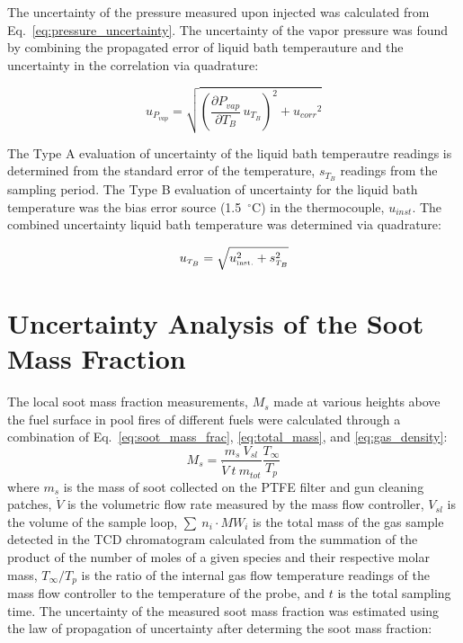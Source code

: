 \documentclass[12pt]{article}
\begin{document}
The uncertainty of the pressure measured upon injected was calculated from Eq.~\ref{eq:pressure_uncertainty}. The uncertainty of the vapor pressure was found by combining the propagated error of liquid bath temperauture and the uncertainty in the correlation via quadrature:

\begin{equation}
\label{eq:vapor_concentration_uncertainty}
u_{\scriptscriptstyle P_{vap}} = \sqrt{{\left(\frac{\partial P_{vap}}{\partial T_{B}}\,u_{\scriptscriptstyle T_{B}} \right)}^2+{u_{corr}}^2}
\end{equation} 

The Type A evaluation of uncertainty of the liquid bath temperautre readings is determined from the standard error of the temperature, $s_{T_{B}}$ readings from the sampling period. The Type B evaluation of uncertainty for the liquid bath temperature was the bias error source (1.5~$^\circ$C) in the thermocouple, $u_{inst}$. The combined uncertainty liquid bath temperature was determined via quadrature:

\begin{equation}
\label{eq:temp_bath_uncertainty}
u_{\scriptscriptstyle T_{B}} = \sqrt{u_{\rm \scriptscriptstyle inst.}^2 + s_{\scriptscriptstyle T_{B}}^2}
\end{equation}


\pagebreak

\section{Uncertainty Analysis of the Soot Mass Fraction} \label{sec:Uncertainty_Soot_Frac}
The local soot mass fraction measurements, $M_{s}$ made at various heights above the fuel surface in pool fires of different fuels were calculated through a combination of Eq.~\ref{eq:soot_mass_frac}, \ref{eq:total_mass}, and \ref{eq:gas_density}:
\begin{equation}\label{eq:overall_soot_mass_frac}
 M_{s}= \frac{m_{s}~V_{sl}}{\dot{V}~t~m_{tot}}\frac{T_{\infty}}{T_{p}}
\end{equation}
where $m_{s}$ is the mass of soot collected on the PTFE filter and gun cleaning patches, $\dot{V}$ is the volumetric flow rate measured by the mass flow controller, $V_{sl}$ is the volume of the sample loop, $\sum~n_{i}\cdot{MW_{i}}$ is the total mass of the gas sample detected in the TCD chromatogram calculated from the summation of the product of the number of moles of a given species and their respective molar mass, $T_{\infty}/T_{p}$ is the ratio of the internal gas flow temperature readings of the mass flow controller to the temperature of the probe, and $t$ is the total sampling time. The uncertainty of the measured soot mass fraction was estimated using the law of propagation of uncertainty after determing the soot mass fraction:
\end{document}
